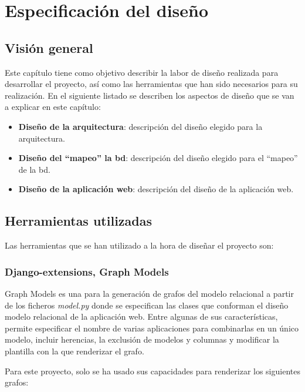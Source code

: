 \chapter{Especificación del diseño}\label{chap:design}

\section{Visión general}

Este capítulo tiene como objetivo describir la labor de diseño realizada para desarrollar el proyecto, así como las herramientas que han sido necesarios para su realización. En el siguiente listado se describen los aspectos de diseño que se van a explicar en este capítulo:

\begin{itemize}
	\item \textbf{Diseño de la arquitectura}: descripción del diseño elegido para la arquitectura.
	\item \textbf{Diseño del ``mapeo'' la \acrlong{bd}}: descripción del diseño elegido para el ``mapeo'' de la \acrshort{bd}.
	\item \textbf{Diseño de la aplicación web}: descripción del diseño de la aplicación web.

\end{itemize}

\section{Herramientas utilizadas}

Las herramientas que se han utilizado a la hora de diseñar el proyecto son:

\subsection{Django-extensions, Graph Models}

Graph Models es una para la generación de grafos del modelo relacional a partir de los ficheros \textit{model.py} donde se especifican las clases que conforman el diseño modelo relacional de la aplicación web. Entre algunas de sus características, permite especificar el nombre de varias aplicaciones para combinarlas en un único modelo, incluir herencias, la exclusión de modelos y columnas y modificar la plantilla con la que renderizar el grafo.

Para este proyecto, solo se ha usado sus capacidades para renderizar los siguientes grafos:

